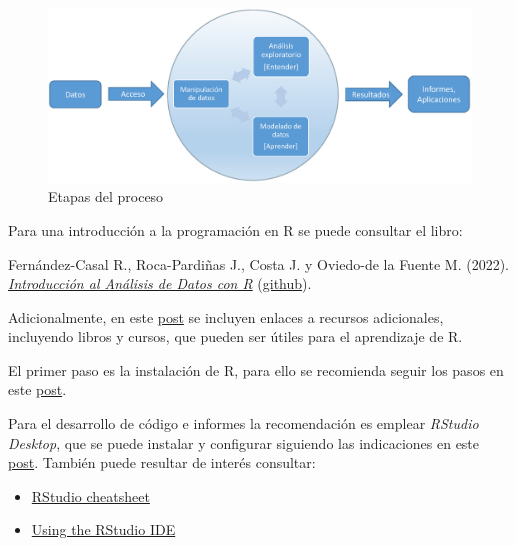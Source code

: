 \documentclass[
]{book}
\theoremstyle{break}
\theoremstyle{nonumberplain}
\begin{document}
\begin{figure}[!htb]

{\centering \includegraphics[width=0.8\linewidth]{figuras/esquema2} 

}

\caption{Etapas del proceso}\label{fig:esquema}
\end{figure}

Para una introducción a la programación en R se puede consultar el libro:

Fernández-Casal R., Roca-Pardiñas J., Costa J. y Oviedo-de la Fuente M. (2022). \emph{\href{https://rubenfcasal.github.io/intror}{Introducción al Análisis de Datos con R}} (\href{https://github.com/rubenfcasal/intror}{github}).

Adicionalmente, en este \href{https://rubenfcasal.github.io/post/ayuda-y-recursos-para-el-aprendizaje-de-r}{post} se incluyen enlaces a recursos adicionales, incluyendo libros y cursos, que pueden ser útiles para el aprendizaje de R.

El primer paso es la instalación de R, para ello se recomienda seguir los pasos en este \href{https://rubenfcasal.github.io/post/instalacion-de-r}{post}.

Para el desarrollo de código e informes la recomendación es emplear \emph{RStudio Desktop}, que se puede instalar y configurar siguiendo las indicaciones en este \href{https://rubenfcasal.github.io/post/instalacion-de-rstudio}{post}.
También puede resultar de interés consultar:

\begin{itemize}
\item
  \href{https://posit.co/wp-content/uploads/2022/10/rstudio-ide-1.pdf}{RStudio cheatsheet}
\item
  \href{https://support.posit.co/hc/en-us/sections/200107586-Using-the-RStudio-IDE}{Using the RStudio IDE}
\end{itemize}
\end{document}

